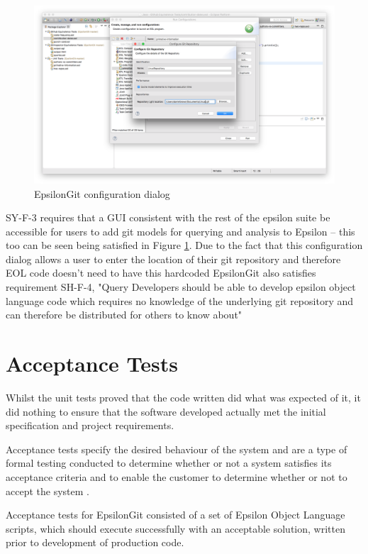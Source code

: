 \documentclass[11pt]{book}
\begin{document}
\begin{figure}[h]
	\centering
	\includegraphics[width=\textwidth]{images/epsilonintegration}
	\caption{EpsilonGit configuration dialog}
	\label{fig:epsilonintegration}
\end{figure}

SY-F-3 requires that a GUI consistent with the rest of the epsilon suite be accessible for users to add git models for querying and analysis to Epsilon -- this too can be seen being satisfied in Figure \ref{fig:epsilonintegration}. Due to the fact that this configuration dialog allows a user to enter the location of their git repository and therefore EOL code doesn't need to have this hardcoded EpsilonGit also satisfies requirement SH-F-4, "Query Developers should be able to develop epsilon object language code which requires no knowledge of the underlying git repository and can therefore be distributed for others to know about"

\section{Acceptance Tests}
\label{evalacceptance}
Whilst the unit tests proved that the code written did what was expected of it, it did nothing to ensure that the software developed actually met the initial specification and project requirements.

Acceptance tests specify the desired behaviour of the system and are a type of formal testing conducted to determine whether or not a system satisfies its acceptance criteria and to enable the customer to determine whether or not to accept the system \cite{acceptancetests1}\cite{acceptancetests2}. 

Acceptance tests for EpsilonGit consisted of a set of Epsilon Object Language scripts, which should execute successfully with an acceptable solution, written prior to development of production code. 
\end{document}
